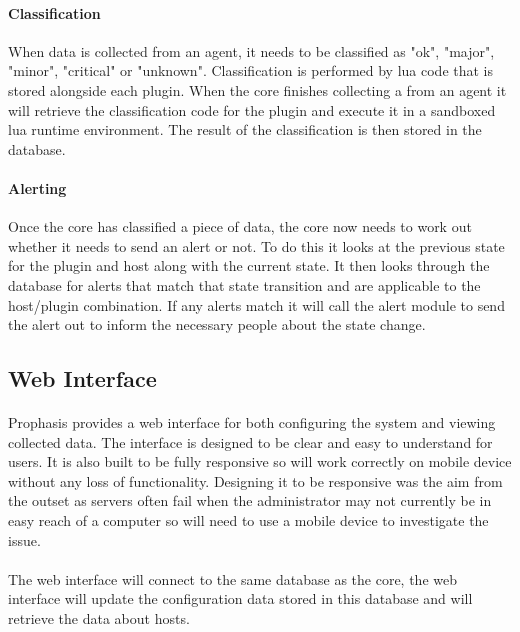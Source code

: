 \documentclass[bsc,logo,twoside]{infthesis}
\begin{document}
\paragraph*{Classification}
	When data is collected from an agent, it needs to be classified as "ok", "major",
	"minor", "critical" or "unknown".  Classification is performed by lua code that
	is stored alongside each plugin.  When the core finishes collecting a 
	from an agent it will retrieve the classification code for the plugin and execute
	it in a sandboxed lua runtime environment.  The result of the classification is
	then stored in the database.
	
\paragraph*{Alerting}
	Once the core has classified a piece of data, the core now needs to work out
	whether it needs to send an alert or not.  To do this it looks at the previous
	state for the plugin and host along with the current state.  It then looks through
	the database for alerts that match that state transition and are applicable to the
	host/plugin combination.  If any alerts match it will call the alert module to send
	the alert out to inform the necessary people about the state change.
	
\subsection{Web Interface}
\paragraph*{}
	Prophasis provides a web interface for both configuring the system and viewing
	collected data.  The interface is designed to be clear and easy to understand for
	users.  It is also built to be fully responsive so will work correctly on mobile
	device without any loss of functionality.  Designing it to be responsive was the
	aim from the outset as servers often fail when the administrator may not currently
	be in easy reach of a computer so will need to use a mobile device to investigate
	the issue.
	
\paragraph*{}
	The web interface will connect to the same database as the core, the web interface
	will update the configuration data stored in this database and will retrieve the
	data about hosts.
	
\end{document}
